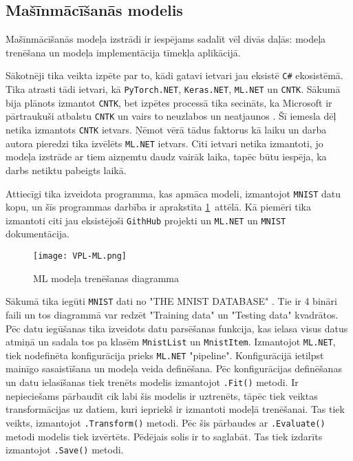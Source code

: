 \subsection{Mašīnmācīšanās modelis}

    Mašīnmācīšanās modeļa izstrādi ir iespējams sadalīt vēl divās daļās: modeļa trenēšana un modeļa
    implementācija tīmekļa aplikācijā.

    Sākotnēji tika veikta izpēte par to, kādi gatavi
    ietvari jau eksistē \texttt{C\#} ekosistēmā. Tika atrasti tādi ietvari, kā \texttt{PyTorch.NET},
    \texttt{Keras.NET}, \texttt{ML.NET} un \texttt{CNTK}. Sākumā bija plānots izmantot \texttt{CNTK},
    bet izpētes processā tika secināts, ka Microsoft ir pārtraukuši atbalstu \texttt{CNTK} un vairs
    to neuzlabos un neatjaunos \cite{chrisbasogluCNTKReleaseNotes}. Šī iemesla dēļ netika izmantots
    \texttt{CNTK} ietvars. Ņēmot vērā tādus faktorus kā laiku un darba autora pieredzi tika izvēlēts
    \texttt{ML.NET} ietvars. Citi ietvari netika izmantoti, jo modeļa izstrāde ar tiem aizņemtu
    daudz vairāk laika, tapēc būtu iespēja, ka darbs netiktu pabeigts laikā.

    Attiecīgi tika izveidota programma, kas apmāca modeli, izmantojot \texttt{MNIST} datu kopu, un
    šīs programmas darbība ir aprakstīta \ref{ml:train}~attēlā. Kā piemēri tika izmantoti citi jau
    eksistējoši \texttt{GithHub} projekti un \texttt{ML.NET} un \texttt{MNIST} dokumentācija.
    \cite{DotnetMachinelearningsamples2021} \cite{kexugitTestRunWorking} \cite{MLNETTutorial}
    \cite{natkeMLNETDocumentation} \cite{paxbunPaxbunCntkMnistPractice2019}

    \begin{figure}[H]
        \centering
        \texttt{[image: VPL-ML.png]}
        \caption{ML modeļa trenēšanas diagramma}
        \label{ml:train}
    \end{figure}

    Sākumā tika iegūti \texttt{MNIST} dati no "THE MNIST DATABASE" \cite{MNISTHandwrittenDigit}. Tie ir
    4 bināri faili un tos diagrammā var redzēt "Training data" un "Testing data" kvadrātos. Pēc datu iegūšanas
    tika izveidots datu parsēšanas funkcija, kas ielasa visus datus atmiņā un sadala tos pa klasēm \texttt{MnistList} un \texttt{MnistItem}. Izmantojot \texttt{ML.NET}, tiek nodefinēta
    konfigurācija prieks \texttt{ML.NET} "pipeline". Konfigurācijā ietilpst mainīgo sasaistīšana un
    modeļa veida definēšana. Pēc konfigurācijas definēšanas un datu ielasīšanas tiek trenēts modelis
    izmantojot \texttt{.Fit()} metodi. Ir nepieciešams pārbaudīt cik labi šis
    modelis ir uztrenēts, tāpēc tiek veiktas transformācijas uz datiem, kuri iepriekš ir izmantoti modeļā trenēšanai. Tas tiek veikts, izmantojot \texttt{.Transform()} metodi. Pēc šis pārbaudes ar \texttt{.Evaluate()} metodi modelis tiek izvērtēts. Pēdējais solis ir to saglabāt. Tas tiek izdarīts
    izmantojot \texttt{.Save()} metodi.

